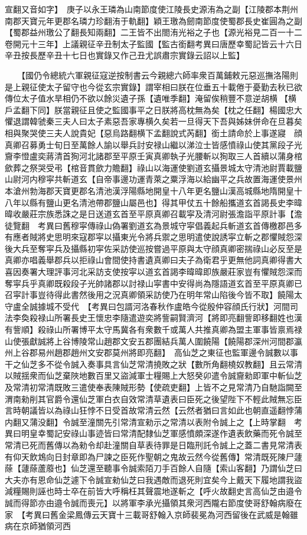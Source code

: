 宣翻又音如字】　庚子以永王璘為山南節度使江陵長史源洧為之副【江陵郡本荆州南郡天寶元年更郡名璘力珍翻洧于軌翻】穎王璬為劒南節度使蜀郡長史崔圓為之副【蜀郡益州璬公了翻長知兩翻】二王皆不出閤洧光裕之子也【源光裕見二百一十二卷開元十三年】上議親征辛丑制太子監國【監古銜翻考異曰唐歷幸蜀記皆云十六日辛丑按長歷辛丑十七日也實錄又作己丑尤誤肅宗實錄云詔以上監】

　　【國仍令總統六軍親征寇逆按制書云今親總六師率衆百萬鋪敕元惡巡撫洛陽則是上親征使太子留守也今從玄宗實錄】謂宰相曰朕在位垂五十載倦于憂勤去秋已欲傳位太子值水旱相仍不欲以餘災遺子孫【遺唯季翻】淹留俟稍豐不意逆胡横【横戶孟翻下同】朕當親征且使之監國事平之日朕將高枕無為矣【枕之任翻】楊國忠大懼退謂韓虢秦三夫人曰太子素惡吾家專横久矣若一旦得天下吾與姊妹併命在旦暮矣相與聚哭使三夫人說貴妃【惡烏路翻横下孟翻說式芮翻】銜土請命於上事遂寢　顔真卿召募勇士旬日至萬餘人諭以舉兵討安禄山繼以涕泣士皆感憤祿山使其黨段子光齎李憕盧奕蔣清首狥河北諸郡至平原壬寅真卿執子光腰斬以狥取三人首續以蒲身棺歛葬之祭哭受弔【棺音貫歛力贍翻】祿山以海運使劉道玄攝景城太守清池尉賈載鹽山尉河内穆寜共斬道玄【自帝事邊功運青萊之粟浮海以給幽平之兵故置海運使景州本滄州勃海郡天寶更郡名清池漢浮陽縣地開皇十八年更名鹽山漢高城縣地隋開皇十八年以縣有鹽山更名清池帶郡鹽山屬邑也】得其甲仗五十餘船攜道玄首謁長史李暐暐收嚴莊宗族悉誅之是日送道玄首至平原真卿召載寜及清河尉張澹詣平原計事【澹徒覽翻　考異曰舊穆寜傳祿山偽署劉道玄為景城守寜倡義起兵斬道玄首傳檄郡邑多有應者賊將史思明來寇郡寜以攝東光令將兵禦之思明遣使說誘寜立斬之郡懼賊怨深後大兵至奪寜兵及攝縣初寜佐采訪使巡按嘗過平原與太守顔真卿密揣祿山必反至是真卿亦唱義舉郡兵以拒祿山會間使持書遺真卿曰夫子為衛君乎更無他詞真卿得書大喜因奏署大理評事河北采訪支使按寜以道玄首謁李暐暐即族嚴莊家豈有懼賊怨深而奪寜兵乎真卿既殺段子光帥諸郡以討禄山寜書中安得尚為隱語道玄首至平原真卿已召寜計事豈待得此書然後用之況真卿領采訪使乃在明年常山陷後今皆不取】饒陽太守盧全誠據城不受代　【考異曰包諝河洛春秋作盧皓今從殷仲容顔氏行狀】河間司法李奐殺禄山所署長史王懷忠李隨遣遊奕將訾嗣賢濟河【將即亮翻訾即移翻姓也漢有訾順】殺祿山所署博平太守馬冀各有衆數千或萬人共推真卿為盟主軍事皆禀焉禄山使張獻誠將上谷博陵常山趙郡文安五郡團結兵萬人圍饒陽【饒陽郡深州河間郡瀛州上谷郡易州趙郡趙州文安郡莫州將即亮翻】　高仙芝之東征也監軍邊令誠數以事干之仙芝多不從令誠入奏事具言仙芝常清撓敗之狀【數所角翻橈奴教翻】且云常清以賊揺衆而仙芝棄陜地數百里又盜減軍士糧賜上大怒癸卯遣令誠齎勑即軍中斬仙芝及常清初常清既敗三遣使奉表陳賊形勢【使疏吏翻】上皆不之見常清乃自馳詣闕至渭南勑削其官爵令還仙芝軍白衣自效常清草遺表曰臣死之後望陛下不輕此賊無忘臣言時朝議皆以為祿山狂悖不日受首故常清云然【云然者猶曰言如此也朝直遥翻悖蒲内翻又蒲没翻】令誠至潼關先引常清宣勑示之常清以表附令誠上之【上時掌翻　考異曰明皇幸蜀記安祿山事迹皆曰常清配隸仙芝軍感憤頗深遂作遺表飲藥而死令誠至常清已死而舊傳以為勑令却赴潼關自草表待罪是日臨刑託令誠上之蓋二書見常清表有仰天飲鴆向日封章即為尸諫之臣死作聖朝之鬼故云然今從舊傳】常清既死陳尸蘧蒢【蘧蒢蘆䕠也】仙芝還至聽事令誠索陌刀手百餘人自隨【索山客翻】乃謂仙芝曰大夫亦有恩命仙芝遽下令誠宣勑仙芝曰我遇敵而退死則宜矣今上戴天下履地謂我盜減糧賜則誣也時士卒在前皆大呼稱枉其聲震地遂斬之【呼火故翻史言高仙芝由邉令誠而得節亦由邉令誠而喪元】以將軍李承光攝領其衆河西隴右節度使哥舒翰病廢在家　【考異曰舊金梁鳳傳云天寶十三載哥舒翰入京師裴冕為河西留後在武威是翰雖病在京師猶領河西